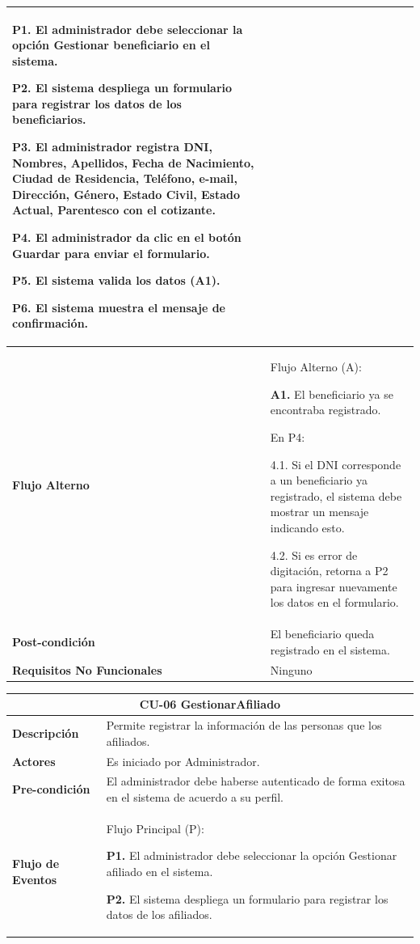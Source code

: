 \documentclass[12pt,a4paper]{article}
\begin{document}
\begin{center}
\begin{tabular}{|m{5.5cm}| m{9.5cm}|}
\textbf{P1.} El administrador debe seleccionar la opción Gestionar beneficiario en el sistema.

\textbf{P2.} El sistema despliega un formulario para registrar los datos de los beneficiarios.

\textbf{P3.} El administrador registra DNI, Nombres, Apellidos, Fecha de Nacimiento, Ciudad de Residencia, Teléfono, e-mail, Dirección, Género, Estado Civil, Estado Actual, Parentesco con el cotizante.

\textbf{P4.} El administrador da clic en el botón Guardar para enviar el formulario.

\textbf{P5.} El sistema valida los datos (A1).

\textbf{P6.} El sistema muestra el mensaje de confirmación.
\\
\hline 
\textbf{Flujo Alterno} &  Flujo Alterno (A):

\textbf{A1.} El beneficiario ya se encontraba registrado.

	En P4:
	
	4.1. Si el DNI corresponde a un beneficiario ya registrado, el sistema debe mostrar un mensaje indicando esto.
	
	4.2. Si es error de digitación, retorna a P2 para ingresar nuevamente los datos en el formulario. \\ 
\hline 
\textbf{Post-condición}  & El beneficiario queda registrado en el sistema. \\ 
\hline 
\textbf{Requisitos No Funcionales} & Ninguno \\ 
\hline 
\end{tabular}
\vspace{5mm}

\begin{tabular}{|m{5.5cm}| m{9.5cm}|}
\hline 
\multicolumn{2}{|c|}{\textbf{CU-06 GestionarAfiliado}} \\ 
\hline 
\textbf{Descripción} & Permite registrar la información de las personas que los afiliados. \\ 
\hline 
\textbf{Actores} & Es iniciado por Administrador. \\ 
\hline 
\textbf{Pre-condición} & El administrador debe haberse autenticado de forma exitosa en el sistema de acuerdo a su perfil. \\ 
\hline 
\textbf{Flujo de Eventos} & Flujo Principal (P):

\textbf{P1.} El administrador debe seleccionar la opción Gestionar afiliado en el sistema.

\textbf{P2.} El sistema despliega un formulario para registrar los datos de los afiliados.


\end{tabular}
\end{center}
\end{document}
